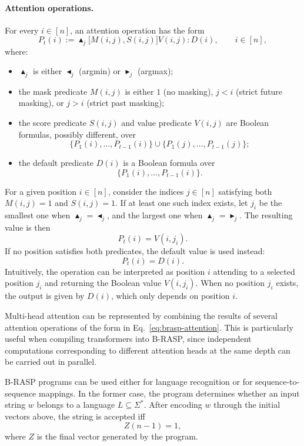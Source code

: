 \paragraph{Attention operations.}
For every $i\in[n]$, an attention operation has the form
\begin{equation}
P_t(i)
:=
\blacktriangle_j
\bigl[M(i,j),S(i,j)\bigr]
V(i,j)
:
D(i),
\qquad i\in[n],
\label{eq:brasp-attention}
\end{equation}
where:
\begin{itemize}
    \item $\blacktriangle_j$ is either $\blacktriangleleft_j$ (argmin) or
    $\blacktriangleright_j$ (argmax);

    \item the mask predicate $M(i,j)$ is either $1$ (no masking), $j<i$
    (strict future masking), or $j>i$ (strict past masking);

    \item the score predicate $S(i,j)$ and value predicate $V(i,j)$ are
    Boolean formulas, possibly different, over
    \[
    \{P_1(i),\ldots,P_{t-1}(i)\}
    \cup
    \{P_1(j),\ldots,P_{t-1}(j)\};
    \]

    \item the default predicate $D(i)$ is a Boolean formula over
    \[
    \{P_1(i),\ldots,P_{t-1}(i)\}.
    \]
\end{itemize}

For a given position $i\in[n]$, consider the indices $j\in[n]$ satisfying
both $M(i,j)=1$ and $S(i,j)=1$. If at least one such index exists, let $j_i$
be the smallest one when
$\blacktriangle_j=\blacktriangleleft_j$, and the largest one when
$\blacktriangle_j=\blacktriangleright_j$. The resulting value is then
\[
P_t(i)=V(i,j_i).
\]
If no position satisfies both predicates, the default value is used instead:
\[
P_t(i)=D(i).
\]
Intuitively, the operation can be interpreted as position $i$ attending to a selected
position $j_i$ and returning the Boolean value $V(i,j_i)$. When no position $j_i$
exists, the output is given by $D(i)$, which only depends on position $i$.

Multi-head attention can be represented by combining the results of several
attention operations of the form in Eq.~\ref{eq:brasp-attention}. This is
particularly useful when compiling transformers into B-RASP, since independent
computations corresponding to different attention heads at the same depth can
be carried out in parallel.

B-RASP programs can be used either for language recognition or for
sequence-to-sequence mappings. In the former case, the program determines
whether an input string $w$ belongs to a language $L\subseteq\Sigma^*$. After
encoding $w$ through the initial vectors above, the string is accepted iff
\[
Z(n-1)=1,
\]
where $Z$ is the final vector generated by the program.

